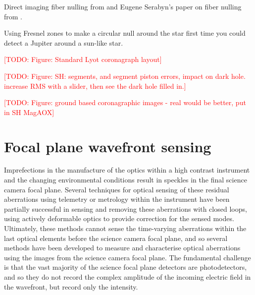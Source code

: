 \documentclass[letterpaper]{ar-1col}
\newcommand{\todo}[1]{\textcolor{red}{[TODO: #1]}}
\begin{document}
Direct imaging fiber nulling from \citet{Mawet17} and Eugene Serabyn's paper on fiber nulling from \citet{Serabyn06}.

Using Fresnel zones to make a circular null around the star \citep{Angel86} first time you could detect a Jupiter around a sun-like star.

\todo{Figure: Standard Lyot coronagraph layout}

\todo{Figure: SH: segments, and segment piston errors, impact on dark hole. increase RMS with a slider, then see the dark hole filled in.}

\todo{Figure: ground based coronagraphic images - real would be better, put in SH MagAOX}

\section{Focal plane wavefront sensing}

Imprefections in the manufacture of the optics within a high contrast instrument and the changing environmental conditions result in speckles in the final science camera focal plane.
%
Several techniques for optical sensing of these residual aberrations using telemetry or metrology within the instrument have been partially successful in sensing and removing these aberrations with closed loops, using actively deformable optics to provide correction for the sensed modes.
%
Ultimately, these methods cannot sense the time-varying aberrations within the last optical elements before the science camera focal plane, and so several methods have been developed to measure and characterise optical aberrations using the images from the science camera focal plane.
%
The fundamental challenge is that the vast majority of the science focal plane detectors are photodetectors, and so they do not record the complex amplitude of the incoming electric field in the wavefront, but record only the intensity.
\end{document}
